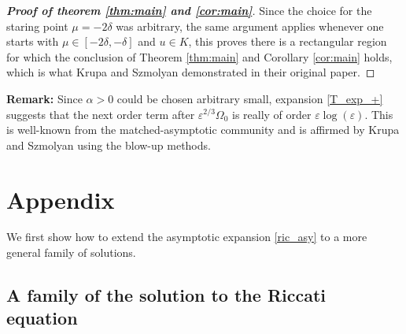 \documentclass[letterpaper,11pt]{article}
\newcommand{\eps}{\varepsilon}
\numberwithin{equation}{section}
\theoremstyle{plain}
\begin{document}
\begin{proof}[\textbf{Proof of theorem \ref{thm:main} and \ref{cor:main}}]
Since the choice for the staring point $\mu = -2\delta$ was arbitrary, the same argument applies whenever one starts with $\mu \in [-2\delta, -\delta]$ and $u \in K$, this proves there is a rectangular region for which the conclusion of Theorem \ref{thm:main} and Corollary \ref{cor:main} holds, which is what Krupa and Szmolyan demonstrated in their original paper.
\end{proof}

\textbf{Remark:} Since $\alpha>0$ could be chosen arbitrary small, expansion \eqref{T_exp_+} suggests that the next order term after $\eps^{2/3}\Omega_0$ is really of order $\eps \log(\eps)$. This is well-known from the matched-asymptotic community and is affirmed by Krupa and Szmolyan using the blow-up methods. 
\pagebreak
\section*{Appendix}
\renewcommand{\thesubsection}{\Alph{subsection}}
We first show how to extend the asymptotic expansion \eqref{ric_asy} to a more general family of solutions.
\subsection{A family of the solution to the Riccati equation }
\end{document}
